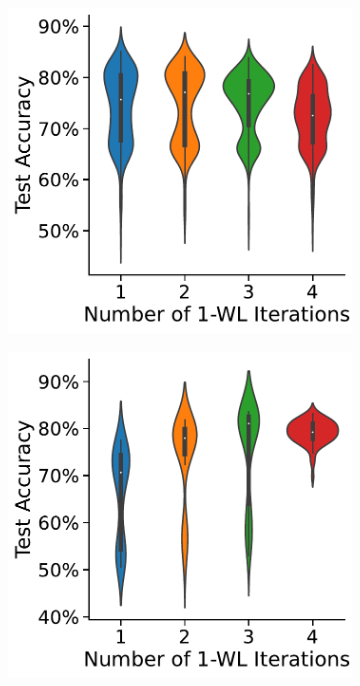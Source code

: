 \begin{figure}[!b]
\begin{subfigure}[b]{0.19\textwidth}
        \caption{\scriptsize\imdb}
	\end{subfigure}
	\hfill
	\begin{subfigure}[b]{0.19\textwidth}
		\centering
		\includegraphics[width=\textwidth]{Figures/k_wl_violin_MUTAG.pdf}
        \caption{\scriptsize\mutag}
	\end{subfigure}
	\hfill
	\begin{subfigure}[b]{0.19\textwidth}
		\centering
		\includegraphics[width=\textwidth]{Figures/k_wl_violin_NCI1.pdf}

\end{subfigure}
\end{figure}
